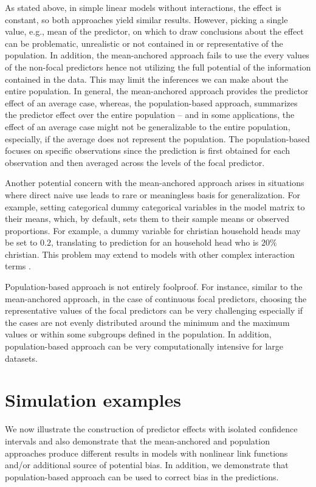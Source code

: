 \documentclass[10pt,letterpaper]{article}
\begin{document}
As stated above, in simple linear models without interactions, the effect is constant, so both approaches yield similar results. However, picking a single value, e.g., mean of the predictor, on which to draw conclusions about the effect can be problematic, unrealistic or not contained in or representative of the population. In addition, the mean-anchored approach fails to use the every values of the non-focal predictors hence not utilizing the full potential of the information contained in the data. This may limit the inferences we can make about the entire population. In general, the mean-anchored approach provides the predictor effect of an average case, whereas, the population-based approach, summarizes the predictor effect over the entire population -- and in some applications, the effect of an average case might not be generalizable to the entire population, especially, if the average does not represent the population. The population-based focuses on specific observations since the prediction is first obtained for each observation and then averaged across the levels of the focal predictor.

Another potential concern with the mean-anchored approach arises in situations where direct naive use leads to rare or meaningless basis for generalization. For example, setting categorical dummy categorical variables in the model matrix to their means, which, by default, sets them to their sample means or observed proportions. For example, a dummy variable for christian household heads may be set to $0.2$, translating to prediction for an household head who is $20\%$ christian. This problem may extend to models with other complex interaction terms \cite{hanmer2013behind}.

Population-based approach is not entirely foolproof. For instance, similar to the mean-anchored approach, in the case of continuous focal predictors, choosing the representative values of the focal predictors can be very challenging especially if the cases are not evenly distributed around the minimum and the maximum values or within some subgroups defined in the population. In addition, population-based approach can be very computationally intensive for large datasets.

\section*{Simulation examples}

We now illustrate the construction of predictor effects with isolated confidence intervals and also demonstrate that the mean-anchored and population approaches produce different results in models with nonlinear link functions and/or additional source of potential bias. In addition, we demonstrate that population-based approach can be used to correct bias in the predictions.
\end{document}
